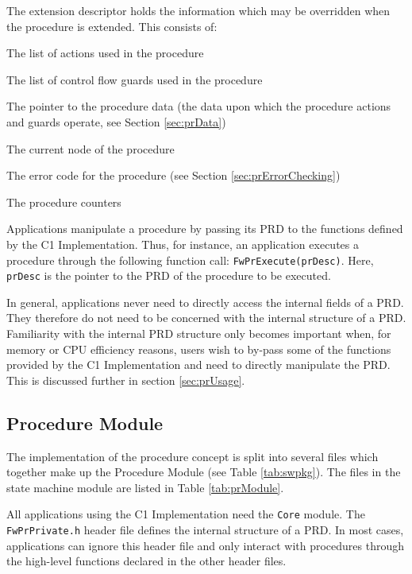 \documentclass[a4paper,10pt]{article}
\newenvironment{fw_itemize}						%
{\begin{itemize}
  \setlength{\itemsep}{1mm}
  \setlength{\parskip}{0pt}
  \setlength{\parsep}{0pt}}
{\end{itemize}}
\begin{document}
The extension descriptor holds the information which may be overridden when the procedure 
is extended. This consists of:

\begin{fw_itemize}
\item The list of actions used in the procedure 
\item The list of control flow guards used in the procedure
\item The pointer to the procedure data (the data upon which the procedure actions 
and guards operate, see Section \ref{sec:prData})
\item The current node of the procedure
\item The error code for the procedure (see Section \ref{sec:prErrorChecking})
\item The procedure counters 
\end{fw_itemize}

Applications manipulate a procedure by passing its PRD to the functions defined by 
the C1 Implementation. Thus, for instance, an application executes a procedure through 
the following function call: \texttt{FwPrExecute(prDesc)}. Here, \texttt{prDesc} is the pointer to the PRD of the procedure to be executed. 

In general, applications never need to directly access the internal fields of a PRD. 
They therefore do not need to be concerned with the internal structure of a PRD. Familiarity with the internal PRD structure only becomes important when, for memory or CPU efficiency reasons, users wish to by-pass some of the functions provided by the C1 Implementation and need to directly manipulate the PRD. This is discussed further in section \ref{sec:prUsage}.

\subsection{Procedure Module}
The implementation of the procedure concept is split into several files which together make up the  
Procedure Module (see Table \ref{tab:swpkg}). The files in the state machine module are listed 
in Table \ref{tab:prModule}.

All applications using the C1 Implementation need the \texttt{Core} module. The \texttt{FwPrPrivate.h} header 
file defines the internal structure of a PRD. In most cases, applications can ignore this header file 
and only interact with procedures through the high-level functions declared in the other header files.
\end{document}
